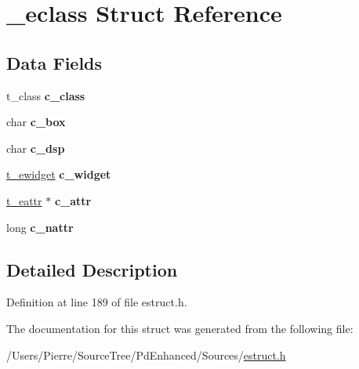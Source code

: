 \hypertarget{struct__eclass}{\section{\-\_\-eclass Struct Reference}
\label{struct__eclass}
}
\subsection*{Data Fields}
\begin{DoxyCompactItemize}
\item 
\hypertarget{struct__eclass_a0469b08ed4568634e94e1ef9844987dc}{t\-\_\-class {\bfseries c\-\_\-class}}\label{struct__eclass_a0469b08ed4568634e94e1ef9844987dc}

\item 
\hypertarget{struct__eclass_a86d57fd0700572f515dcadd123b81748}{char {\bfseries c\-\_\-box}}\label{struct__eclass_a86d57fd0700572f515dcadd123b81748}

\item 
\hypertarget{struct__eclass_abaf25e7000ad5092f017cdaa75e5a38f}{char {\bfseries c\-\_\-dsp}}\label{struct__eclass_abaf25e7000ad5092f017cdaa75e5a38f}

\item 
\hypertarget{struct__eclass_ae7433b03225f5ef8d13d025e6545952c}{\hyperlink{struct__ewidget}{t\-\_\-ewidget} {\bfseries c\-\_\-widget}}\label{struct__eclass_ae7433b03225f5ef8d13d025e6545952c}

\item 
\hypertarget{struct__eclass_a5770c150b221e33c7502b23d066675fa}{\hyperlink{struct__eattr}{t\-\_\-eattr} $\ast$ {\bfseries c\-\_\-attr}}\label{struct__eclass_a5770c150b221e33c7502b23d066675fa}

\item 
\hypertarget{struct__eclass_a2214009a25c6ee1b8b41008f15995c85}{long {\bfseries c\-\_\-nattr}}\label{struct__eclass_a2214009a25c6ee1b8b41008f15995c85}

\end{DoxyCompactItemize}


\subsection{Detailed Description}


Definition at line 189 of file estruct.\-h.



The documentation for this struct was generated from the following file\-:\begin{DoxyCompactItemize}
\item 
/\-Users/\-Pierre/\-Source\-Tree/\-Pd\-Enhanced/\-Sources/\hyperlink{estruct_8h}{estruct.\-h}\end{DoxyCompactItemize}

